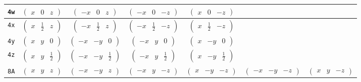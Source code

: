 \documentclass[fleqn,9pt,landscape]{jsarticle}
\begin{document}
\begin{center}
\begin{longtable}{ccccccc}
{\tt 4w} & $ \begin{pmatrix} x & 0 & z \end{pmatrix} $ & $ \begin{pmatrix} - x & 0 & z \end{pmatrix} $ & $ \begin{pmatrix} - x & 0 & - z \end{pmatrix} $ & $ \begin{pmatrix} x & 0 & - z \end{pmatrix} $ & $  $ & $  $ \\ \hline
{\tt 4x} & $ \begin{pmatrix} x & \frac{1}{2} & z \end{pmatrix} $ & $ \begin{pmatrix} - x & \frac{1}{2} & z \end{pmatrix} $ & $ \begin{pmatrix} - x & \frac{1}{2} & - z \end{pmatrix} $ & $ \begin{pmatrix} x & \frac{1}{2} & - z \end{pmatrix} $ & $  $ & $  $ \\ \hline
{\tt 4y} & $ \begin{pmatrix} x & y & 0 \end{pmatrix} $ & $ \begin{pmatrix} - x & - y & 0 \end{pmatrix} $ & $ \begin{pmatrix} - x & y & 0 \end{pmatrix} $ & $ \begin{pmatrix} x & - y & 0 \end{pmatrix} $ & $  $ & $  $ \\ \hline
{\tt 4z} & $ \begin{pmatrix} x & y & \frac{1}{2} \end{pmatrix} $ & $ \begin{pmatrix} - x & - y & \frac{1}{2} \end{pmatrix} $ & $ \begin{pmatrix} - x & y & \frac{1}{2} \end{pmatrix} $ & $ \begin{pmatrix} x & - y & \frac{1}{2} \end{pmatrix} $ & $  $ & $  $ \\ \hline
{\tt 8A} & $ \begin{pmatrix} x & y & z \end{pmatrix} $ & $ \begin{pmatrix} - x & - y & z \end{pmatrix} $ & $ \begin{pmatrix} - x & y & - z \end{pmatrix} $ & $ \begin{pmatrix} x & - y & - z \end{pmatrix} $ & $ \begin{pmatrix} - x & - y & - z \end{pmatrix} $ & $ \begin{pmatrix} x & y & - z \end{pmatrix} $ \\

\end{longtable}
\end{center}
\end{document}
